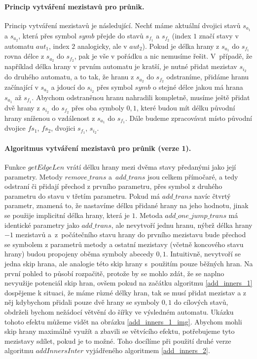 \paragraph{Princip vytváření mezistavů pro průnik.} Princip vytváření mezistavů je následující. Nechť máme aktuální dvojici stavů $s_{a_1}$ a $s_{a_2}$, která přes symbol $symb$ přejde do stavů $s_{f_1}$ a $s_{f_2}$ (index $1$ značí stavy v automatu $aut_1$, index $2$ analogicky, ale v $aut_2$). Pokud je délka hrany z $s_{a_1}$ do $s_{f_1}$ rovna délce z $s_{a_2}$ do $s_{f_2}$, pak je vše v pořádku a nic nemusíme řešit. V~případě, že například délka hrany v prvním automatu je kratší, je nutné přidat mezistav $s_{i_2}$ do druhého automatu, a to tak, že hranu z $s_{a_2}$ do $s_{f_2}$ odstraníme, přidáme hranu začínající v $s_{a_2}$ a jdoucí do $s_{i_2}$ přes symbol $symb$ o stejné délce jakou má hrana $s_{a_1}$ až $s_{f_1}$. Abychom odstraněnou hranu nahradili kompletně, musíme ještě přidat dvě hrany z $s_{i_2}$ do $s_{f_2}$ přes oba symboly $0,1$, které budou mít délku původní hrany sníženou o vzdálenost z $s_{a_1}$ do $s_{f_1}$. Dále budeme zpracovávat místo původní dvojice $fs_1$, $fs_2$, dvojici $s_{f_1}$, $s_{i_2}$. 

\paragraph{Algoritmus vytváření mezistavů pro průnik (verze 1).} Funkce $getEdgeLen$ vrátí délku hrany mezi dvěma stavy předanými jako její parametry. Metody $remove\_trans$ a~$add\_trans$ jsou celkem přímočaré, a tedy odstraní či přidají přechod z prvního parametru, přes symbol z druhého parametru do stavu v třetím parametru. Pokud má $add\_trans$ navíc čtvrtý parametr, znamená to, že nastavíme délku přidané hrany na jeho hodnotu, jinak se použije implicitní délka hrany, která je $1$. Metoda $add\_one\_jump\_trans$ má identické parametry jako $add\_trans$, ale nevytvoří jednu hranu, nýbrž délka hrany $-1$ mezistavů a~z~počátečního stavu hrany do prvního mezistavu bude přechod se symbolem z parametrů metody a ostatní mezistavy (včetně koncového stavu hrany) budou propojeny oběma symboly abecedy $0,1$. Intuitivně, nevytvoří se jedna skip hrana, ale analogie této skip hrany s~použitím pouze běžných hran. Na první pohled to působí rozpačitě, protože by se mohlo zdát, že se naplno nevyužije potenciál skip hran, ovšem pokud na začátku algoritmu \ref{add_inners_1} dospějeme k situaci, že máme různé délky hran, tak se musí přidat mezistav a z něj kdybychom přidali pouze dvě hrany se symboly $0,1$ do cílových stavů, obdrželi bychom nežádocí větvění do šířky ve výsledném automatu. Ukázku tohoto efektu můžeme vidět na obrázku \ref{add_inners_1_img}. Abychom mohli skip hrany maximálně využít a zbavili se větvícího efektu, potřebujeme tyto mezistavy sdílet, pokud je to možné. Toho docílíme při použití druhé verze algoritmu $addInnersInter$ vyjádřeného algoritmem \ref{add_inners_2}.

